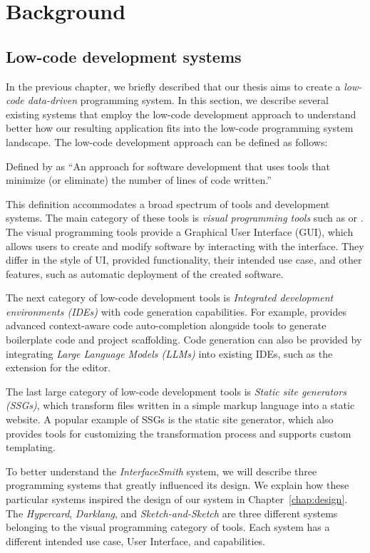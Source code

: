 \chapter{Background}
\label{chap:background}
\section{Low-code development systems}
\label{sec:low-code}

In the previous chapter, we briefly described that our thesis aims to create a \emph{low-code data-driven} programming system.
In this section, we describe several existing systems that employ the low-code development approach to understand better how our resulting application fits into the low-code programming system landscape.
The low-code development approach can be defined as follows:
\begin{defn}
	Defined by \citet{Pinho_Aguiar_Amaral_2023} as ``An approach for software development that uses tools that minimize (or eliminate) the number of lines of code written.''
\end{defn}
This definition accommodates a broad spectrum of tools and development systems.
The main category of these tools is \emph{visual programming tools} such as \citet{darklang} or \citet{mendix}.
The visual programming tools provide a Graphical User Interface (GUI), which allows users to create and modify software by interacting with the interface.
They differ in the style of UI, provided functionality, their intended use case, and other features, such as automatic deployment of the created software.

The next category of low-code development tools is \emph{Integrated development environments (IDEs)} with code generation capabilities.
For example, \citet{Rider} provides advanced context-aware code auto-completion alongside tools to generate boilerplate code and project scaffolding.
Code generation can also be provided by integrating \emph{Large Language Models (LLMs)} into existing IDEs, such as the~\citet{copilot} extension for the \citet{vscode} editor.

The last large category of low-code development tools is \emph{Static site generators (SSGs)}, which transform files written in a simple markup language into a static website.
A popular example of SSGs is the \citet{hugo} static site generator, which also provides tools for customizing the transformation process and supports custom templating.

To better understand the \emph{InterfaceSmith} system, we will describe three programming systems that greatly influenced its design.
We explain how these particular systems inspired the design of our system in Chapter~\ref{chap:design}.
The \emph{Hypercard}, \emph{Darklang}, and \emph{Sketch-and-Sketch} are three different systems belonging to the visual programming category of tools.
Each system has a different intended use case, User Interface, and capabilities.

